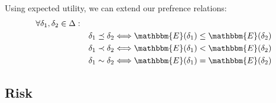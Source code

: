 Using expected utility, we can extend our prefrence relations:
\vspace{-0.5em}
\begin{subequations}
    \begin{align*}
    \forall \delta_1, \delta_2 \in \Delta: \quad& \\
    & \delta_1 \preceq \delta_2 \Longleftrightarrow \mathbbm{E}(\delta_1) \leq \mathbbm{E}(\delta_2) \\
    & \delta_1 \prec \delta_2 \Longleftrightarrow \mathbbm{E}(\delta_1) < \mathbbm{E}(\delta_2) \\
    & \delta_1 \sim \delta_2 \Longleftrightarrow \mathbbm{E}(\delta_1) = \mathbbm{E}(\delta_2) \\
    \end{align*}
\end{subequations}

\subsection{Risk}
